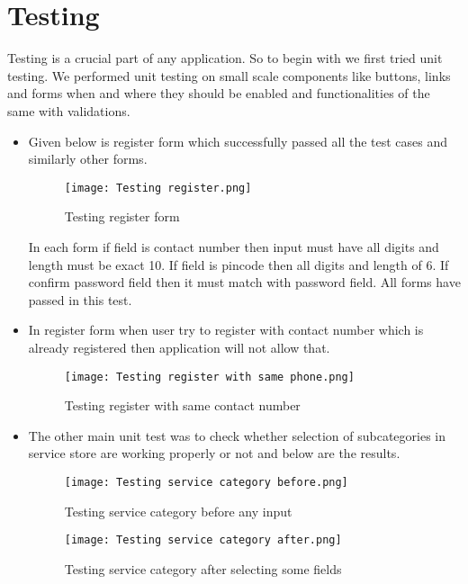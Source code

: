 \documentclass[conference]{IEEEtran}
\begin{document}
\vspace{1cm}
\section{Testing}
Testing is a crucial part of any application. So to begin with we first tried unit testing. We performed unit testing on small scale components like buttons, links and forms when and where they should be enabled and functionalities of the same with validations. 

\begin{itemize}
    \item Given below is register form which successfully passed all the test cases and similarly other forms.
    \begin{figure}[H]
        \centering
        \texttt{[image: Testing register.png]}
        \caption{Testing register form}
        \label{fig:testRegister}
    \end{figure}
     In each form if field is contact number then input must have all digits and length must be exact 10. If field is pincode then all digits and length of 6. If confirm password field then it must match with password field. All forms have passed in this test.
    
    \vspace{0.5cm}
    \item In register form when user try to register with contact number which is already registered then application will not allow that.
    \begin{figure}[H]
        \centering
        \texttt{[image: Testing register with same phone.png]}
        \caption{Testing register with same contact number}
        \label{fig:testRegisterWithSamePhone}
    \end{figure}
    
    \item The other main unit test was to check whether selection of subcategories in service store are working properly or not and below are the results.
    \begin{figure}[H]
        \centering
        \texttt{[image: Testing service category before.png]}
        \caption{Testing service category before any input}
        \label{fig:testServiceCategoryBefore}
    \end{figure}
    \begin{figure}[H]
        \centering
        \texttt{[image: Testing service category after.png]}
        \caption{Testing service category after selecting some fields}
        \label{fig:testServiceCategoryAfter}
    \end{figure}
    

\end{itemize}
\end{document}

